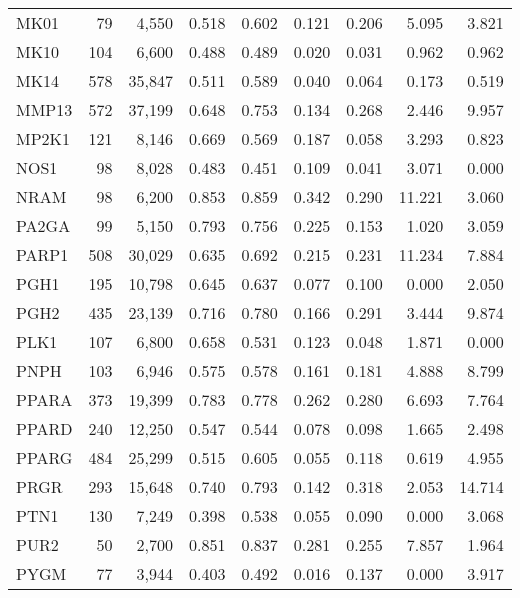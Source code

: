 \begin{center}
\begin{footnotesize}
\begin{longtable}{lrrrrrrrr}
			MK01   & 79    & 4,550    & 0.518   & 0.602   & 0.121   & 0.206   & 5.095   & 3.821  \\
			MK10   & 104   & 6,600    & 0.488   & 0.489   & 0.020   & 0.031   & 0.962   & 0.962  \\
			MK14   & 578   & 35,847   & 0.511   & 0.589   & 0.040   & 0.064   & 0.173   & 0.519  \\
			MMP13  & 572   & 37,199   & 0.648   & 0.753   & 0.134   & 0.268   & 2.446   & 9.957  \\
			MP2K1  & 121   & 8,146    & 0.669   & 0.569   & 0.187   & 0.058   & 3.293   & 0.823  \\
			NOS1   & 98    & 8,028    & 0.483   & 0.451   & 0.109   & 0.041   & 3.071   & 0.000  \\
			NRAM   & 98    & 6,200    & 0.853   & 0.859   & 0.342   & 0.290   & 11.221  & 3.060  \\
			PA2GA  & 99    & 5,150    & 0.793   & 0.756   & 0.225   & 0.153   & 1.020   & 3.059  \\
			PARP1  & 508   & 30,029   & 0.635   & 0.692   & 0.215   & 0.231   & 11.234  & 7.884  \\
			PGH1   & 195   & 10,798   & 0.645   & 0.637   & 0.077   & 0.100   & 0.000   & 2.050  \\
			PGH2   & 435   & 23,139   & 0.716   & 0.780   & 0.166   & 0.291   & 3.444   & 9.874  \\
			PLK1   & 107   & 6,800    & 0.658   & 0.531   & 0.123   & 0.048   & 1.871   & 0.000  \\
			PNPH   & 103   & 6,946    & 0.575   & 0.578   & 0.161   & 0.181   & 4.888   & 8.799  \\
			PPARA  & 373   & 19,399   & 0.783   & 0.778   & 0.262   & 0.280   & 6.693   & 7.764  \\
			PPARD  & 240   & 12,250   & 0.547   & 0.544   & 0.078   & 0.098   & 1.665   & 2.498  \\
			PPARG  & 484   & 25,299   & 0.515   & 0.605   & 0.055   & 0.118   & 0.619   & 4.955  \\
			PRGR   & 293   & 15,648   & 0.740   & 0.793   & 0.142   & 0.318   & 2.053   & 14.714 \\
			PTN1   & 130   & 7,249    & 0.398   & 0.538   & 0.055   & 0.090   & 0.000   & 3.068  \\
			PUR2   & 50    & 2,700    & 0.851   & 0.837   & 0.281   & 0.255   & 7.857   & 1.964  \\
			PYGM   & 77    & 3,944    & 0.403   & 0.492   & 0.016   & 0.137   & 0.000   & 3.917  \\

\end{longtable}
\end{footnotesize}
\end{center}
